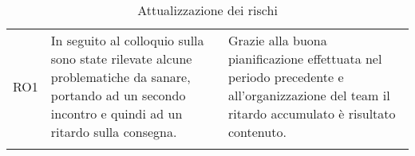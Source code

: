 \begin{longtable}{C{1cm} | C{8cm} | C{7cm}}
  	RO1 & In seguito al colloquio sulla  sono state rilevate alcune problematiche da sanare, portando ad un secondo incontro e quindi ad un ritardo sulla consegna. & Grazie alla buona pianificazione effettuata nel periodo precedente e all'organizzazione del team il ritardo accumulato è risultato contenuto.\\
 	
 	\caption{Attualizzazione dei rischi}
 	
\end{longtable}